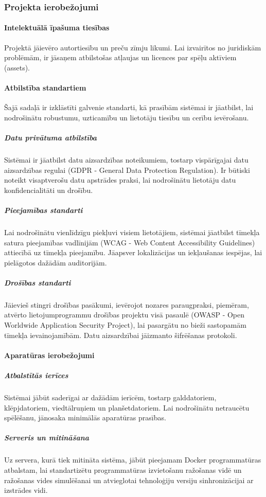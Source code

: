 \subsubsection{Projekta ierobežojumi}

\paragraph{Intelektuālā īpašuma tiesības}

Projektā jāievēro autortiesību un preču zīmju likumi. Lai izvairītos no
juridiskām problēmām, ir jāsaņem atbilstošas atļaujas un licences par spēļu
aktīviem (assets).

\paragraph{Atbilstība standartiem}

Šajā sadaļā ir izklāstīti galvenie standarti, kā prasībām sistēmai ir
jāatbilst, lai nodrošinātu robustumu, uzticamību un lietotāju tiesību un
cerību ievērošanu.

\subparagraph{Datu privātuma atbilstība}

Sistēmai ir jāatbilst datu aizsardzības noteikumiem, tostarp
vispārīgajai datu aizsardzības regulai (GDPR - General Data Protection
Regulation). Ir būtiski noteikt visaptverošu datu apstrādes praksi, lai
nodrošinātu lietotāju datu konfidencialitāti un drošību.

\subparagraph{Pieejamības standarti}

Lai nodrošinātu vienlīdzīgu piekļuvi visiem lietotājiem, sistēmai
jāatbilst tīmekļa satura pieejamības vadlīnijām (WCAG - Web Content
Accessibility Guidelines) attiecībā uz tīmekļa pieejamību. Jāapsver
lokalizācijas un iekļaušanas iespējas, lai pielāgotos dažādām
auditorijām.

\subparagraph{Drošības standarti}

Jāievieš stingri drošības pasākumi, ievērojot nozares paraugpraksi,
piemēram, atvērto lietojumprogrammu drošības projektu visā pasaulē
(OWASP - Open Worldwide Application Security Project), lai pasargātu no
bieži sastopamām tīmekļa ievainojamībām. Datu aizsardzībai jāizmanto
šifrēšanas protokoli.

\paragraph{Aparatūras ierobežojumi}

\subparagraph{Atbalstītās ierīces}

Sistēmai jābūt saderīgai ar dažādām ierīcēm, tostarp galddatoriem,
klēpjdatoriem, viedtālruņiem un planšetdatoriem. Lai nodrošinātu
netraucētu spēlēšanu, jānosaka minimālās aparatūras prasības.

\subparagraph{Serveris un mitināšana}

Uz servera, kurā tiek mitināta sistēma, jābūt pieejamam Docker
programmatūras atbalstam, lai standartizētu programmatūras izvietošanu
ražošanas vidē un ražošanas vides simulēšanai un atvieglotai
tehnoloģiju versiju sinhronizācijai ar izstrādes vidi.
